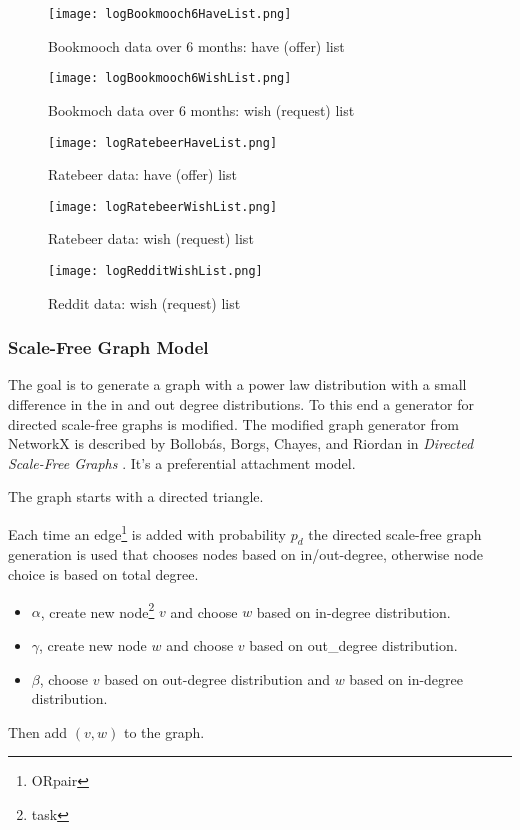 \documentclass[main.tex]{subfiles}
\begin{document}
\begin{figure}[!tbp]
  \centering
  \begin{minipage}[b]{0.45\textwidth}
    \texttt{[image: logBookmooch6HaveList.png]}
    \caption{Bookmooch data over 6 months: have (offer) list}
  \end{minipage}
  \hfill
  \begin{minipage}[b]{0.45\textwidth}
    \texttt{[image: logBookmooch6WishList.png]}
    \caption{Bookmoch data over 6 months: wish (request) list}
  \end{minipage}
\end{figure}

\begin{figure}[!tbp]
  \centering
  \begin{minipage}[b]{0.45\textwidth}
    \texttt{[image: logRatebeerHaveList.png]}
    \caption{Ratebeer data: have (offer) list}
  \end{minipage}
  \hfill
  \begin{minipage}[b]{0.45\textwidth}
    \texttt{[image: logRatebeerWishList.png]}
    \caption{Ratebeer data: wish (request) list}
  \end{minipage}
\end{figure}

\begin{figure}[!tbp]
  \centering
  \begin{minipage}[b]{\textwidth}
    \texttt{[image: logRedditWishList.png]}
    \caption{Reddit data: wish (request) list}
  \end{minipage}
\end{figure}

\subsubsection{Scale-Free Graph Model} \label{sec:model}
The goal is to generate a graph with a power law distribution with a small difference in the in and out degree distributions. To this end a generator for directed scale-free graphs is modified. The modified graph generator from NetworkX \cite{netX} is described by Bollobás, Borgs, Chayes, and Riordan in \textit{Directed Scale-Free Graphs} \cite{Bol}. It's a preferential attachment model.

The graph starts with a directed triangle.

Each time an edge\footnote{ORpair} is added with probability $p_d$ the directed scale-free graph generation is used that chooses nodes based on in/out-degree, otherwise node choice is based on total degree.
\begin{itemize}
  \item $\alpha$, create new node\footnote{task} $v$ and choose $w$ based on in-degree distribution.
  \item $\gamma$, create new node $w$ and choose $v$ based on out\_degree distribution.
  \item $\beta$, choose $v$ based on out-degree distribution and $w$ based on in-degree distribution.
\end{itemize}
Then add $(v,w)$ to the graph.
\end{document}
